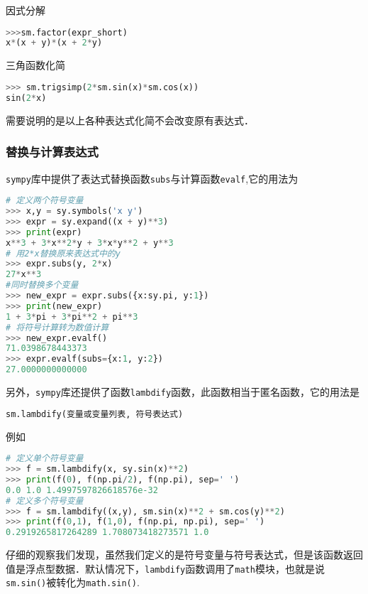 因式分解
\begin{lstlisting}[language=python]
>>>sm.factor(expr_short) 
x*(x + y)*(x + 2*y)

\end{lstlisting}

三角函数化简
\begin{lstlisting}[language=python]
>>> sm.trigsimp(2*sm.sin(x)*sm.cos(x))
sin(2*x)
\end{lstlisting}
需要说明的是以上各种表达式化简不会改变原有表达式．

\subsubsection{替换与计算表达式}
\verb|sympy|库中提供了表达式替换函数\verb|subs|与计算函数\verb|evalf|,它的用法为
\begin{lstlisting}[language=python]
# 定义两个符号变量
>>> x,y = sy.symbols('x y')
>>> expr = sy.expand((x + y)**3)
>>> print(expr)
x**3 + 3*x**2*y + 3*x*y**2 + y**3
# 用2*x替换原来表达式中的y
>>> expr.subs(y, 2*x)
27*x**3
#同时替换多个变量
>>> new_expr = expr.subs({x:sy.pi, y:1})
>>> print(new_expr)
1 + 3*pi + 3*pi**2 + pi**3
# 将符号计算转为数值计算
>>> new_expr.evalf() 
71.0398678443373
>>> expr.evalf(subs={x:1, y:2})
27.0000000000000
\end{lstlisting}
另外，\verb|sympy|库还提供了函数\verb|lambdify|函数，此函数相当于匿名函数，它的用法是
\begin{lstlisting}[language=python]
 sm.lambdify(变量或变量列表, 符号表达式)
\end{lstlisting}
例如
\begin{lstlisting}[language=python]
# 定义单个符号变量
>>> f = sm.lambdify(x, sy.sin(x)**2)
>>> print(f(0), f(np.pi/2), f(np.pi), sep=' ')
0.0 1.0 1.4997597826618576e-32
# 定义多个符号变量
>>> f = sm.lambdify((x,y), sm.sin(x)**2 + sm.cos(y)**2)
>>> print(f(0,1), f(1,0), f(np.pi, np.pi), sep=' ')
0.2919265817264289 1.708073418273571 1.0
\end{lstlisting}
仔细的观察我们发现，虽然我们定义的是符号变量与符号表达式，但是该函数返回值是浮点型数据．默认情况下，\verb|lambdify|函数调用了\verb|math|模块，也就是说\verb|sm.sin()|被转化为\verb|math.sin()|.

